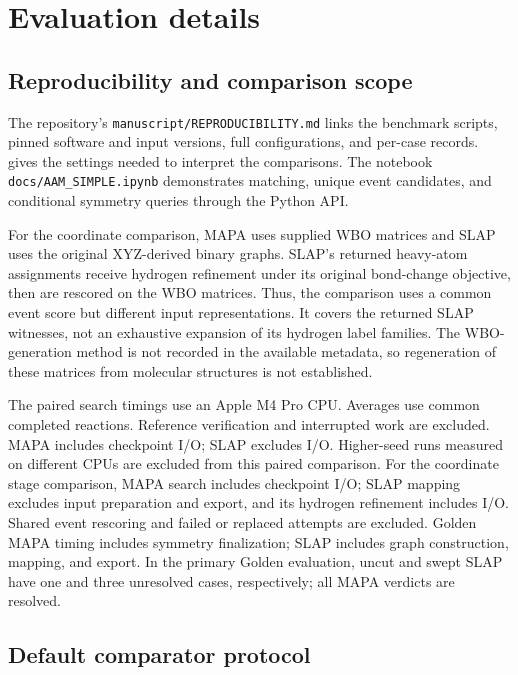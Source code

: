\section{Evaluation details}
\label{sec:reproducibility}
\setcounter{table}{0}
\renewcommand{\thetable}{A\arabic{table}}

\subsection{Reproducibility and comparison scope}

The repository's \texttt{manuscript/REPRODUCIBILITY.md} links the benchmark scripts, pinned software and input versions, full configurations, and per-case records.  gives the settings needed to interpret the comparisons. The notebook \texttt{docs/AAM\_SIMPLE.ipynb} demonstrates matching, unique event candidates, and conditional symmetry queries through the Python API.

For the coordinate comparison, MAPA uses supplied WBO matrices and SLAP uses the original XYZ-derived binary graphs. SLAP's returned heavy-atom assignments receive hydrogen refinement under its original bond-change objective, then are rescored on the WBO matrices. Thus, the comparison uses a common event score but different input representations. It covers the returned SLAP witnesses, not an exhaustive expansion of its hydrogen label families. The WBO-generation method is not recorded in the available metadata, so regeneration of these matrices from molecular structures is not established.

The paired search timings use an Apple M4 Pro CPU. Averages use \CommonCases{} common completed reactions. Reference verification and interrupted work are excluded. MAPA includes checkpoint I/O; SLAP excludes I/O. Higher-seed runs measured on different CPUs are excluded from this paired comparison. For the coordinate stage comparison, MAPA search includes checkpoint I/O; SLAP mapping excludes input preparation and export, and its hydrogen refinement includes I/O. Shared event rescoring and failed or replaced attempts are excluded. Golden MAPA timing includes symmetry finalization; SLAP includes graph construction, mapping, and export. In the primary Golden evaluation, uncut and swept SLAP have one and three unresolved cases, respectively; all MAPA verdicts are resolved.

\subsection{Default comparator protocol}
\label{sec:default-comparators}

